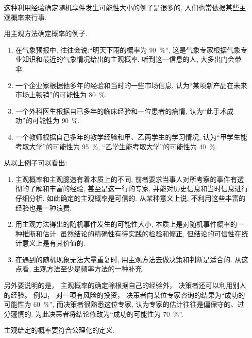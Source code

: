 这种利用经验确定随机享件发生可能性大小的例子是很多的,
人们也常依据某些主观概率来行事.

\begin{example}
  用主观方法确定概率的例子.
  \begin{enumerate}
    \item 在气象预报中,
    往往会说:“明天下雨的概率为 \SI{90}{\percent}”,
    这是气象专家根据气象专业知识和最近的气象情况给出的主观概率.
    听到这一信息的人,
    大多出门会带伞.

    \item 一个企业家根据他多年的经验和当时的一些市场信息,
    认为“某项新产品在未来市场上畅销”的可能性为 \SI{80}{\percent}.

    \item 一个外科医生根据自已多年的临床经验和一位患者的病情,
    认为“此手术成功”的可能性为 \SI{90}{\percent}.

    \item 一个教师根据自己多年的教学经验和甲、乙两学生的学习情况,
    认为“甲学生能考取大学”的可能性为 \SI{95}{\percent},
    “乙学生能考取大学”的可能性为 \SI{40}{\percent}.
  \end{enumerate}
\end{example}

从以上例子可以看出:
\begin{enumerate}
  \item 主观概率和主观臆造有着本质上的不同,
  前者要求当事人对所考察的事件有透彻的了解和丰富的经验,
  甚至是这一行的专家,
  并能对历史信息和当时信息进行仔细分析,
  如此确定的主观概率是可信的.
  从某种意义上说,
  不利用这些丰富的经验也是一种浪费.
  \item 用主观方法得出的随机事件发生的可能性大小,
  本质上是对随机事件概率的一种推断和估计.
  虽然结论的精确性有待实践的检验和修正,
  但结论的可信性在统计意义上是有其价值的.
  \item 在遇到的随机现象无法大量重复时,
  用主观方法去做决策和判断是适合的.
  从这点看,
  主观方法至少是频率方法的一种补充.
\end{enumerate}

另外要说明的是，
主观概率的确定除根据自己的经验外，
决策者还可以利用别人的经验。
例如，
对一项有风险的投资，
决策者向某位专家咨询的结果为“成功的可能性为 \SI{60}{\percent}”,
而决策者很熟悉这位专家,
认为专家的估计往往是偏保守的、过分蘧慎的.
为此决策者将结论修改为“成功的可能性为 \SI{70}{\percent}”.

主观给定的概率要符合公理化的定义.

